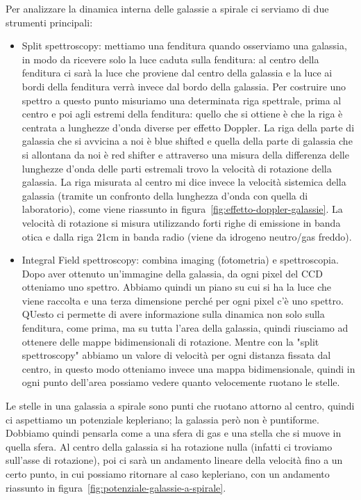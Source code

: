 Per analizzare la dinamica interna delle galassie a spirale ci serviamo di due strumenti principali:
\begin{itemize}
    \item Split spettroscopy: mettiamo una fenditura quando osserviamo una galassia, in modo da ricevere solo la luce caduta sulla fenditura: al centro della fenditura ci sarà la luce che proviene dal centro della galassia e la luce ai bordi della fenditura verrà invece dal bordo della galassia. Per costruire uno spettro a questo punto misuriamo una determinata riga spettrale, prima al centro e poi agli estremi della fenditura: quello che si ottiene è che la riga è centrata a lunghezze d’onda diverse per effetto Doppler. La riga della parte di galassia che si avvicina a noi è blue shifted e quella della parte di galassia che si allontana da noi è red shifter e attraverso una misura della differenza delle lunghezze d’onda delle parti estremali trovo la velocità di rotazione della galassia. La riga misurata al centro mi dice invece la velocità sistemica della galassia (tramite un confronto della lunghezza d’onda con quella di laboratorio), come viene riassunto in figura~\ref{fig:effetto-doppler-galassie}. La velocità di rotazione si misura utilizzando forti righe di emissione in banda otica e dalla riga 21cm in banda radio (viene da idrogeno neutro/gas freddo). 

    \item Integral Field spettroscopy: combina imaging (fotometria) e spettroscopia. Dopo aver ottenuto un’immagine della galassia, da ogni pixel del CCD otteniamo uno spettro. Abbiamo quindi un piano su cui si ha la luce che viene raccolta e una terza dimensione perché per ogni pixel c'è uno spettro. QUesto ci permette di avere informazione sulla dinamica non solo sulla fenditura, come prima, ma su tutta l’area della galassia, quindi riusciamo ad ottenere delle mappe bidimensionali di rotazione. Mentre con la "split spettroscopy" abbiamo un valore di velocità per ogni distanza fissata dal centro, in questo modo otteniamo invece una mappa bidimensionale, quindi in ogni punto dell’area possiamo vedere quanto velocemente ruotano le stelle.
\end{itemize}

Le stelle in una galassia a spirale sono punti che ruotano attorno al centro, quindi  ci aspettiamo un potenziale kepleriano; la galassia però non è puntiforme. Dobbiamo quindi pensarla come a una sfera di gas e una stella che si muove in quella sfera. Al centro della galassia si ha rotazione nulla (infatti ci troviamo sull'asse di rotazione), poi ci sarà un andamento lineare della velocità fino a un certo punto, in cui possiamo ritornare al caso kepleriano, con un andamento riassunto in figura~\ref{fig:potenziale-galassie-a-spirale}.

